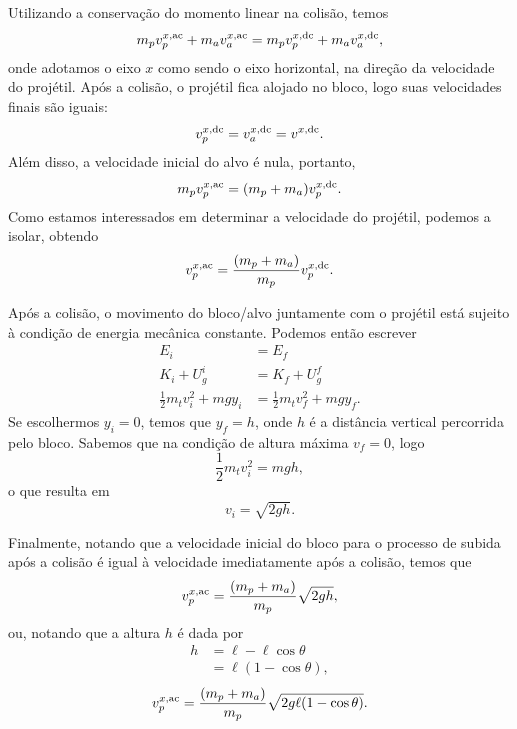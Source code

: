 Utilizando a conservação do momento linear na colisão, temos
\begin{equation}
    m_p v_p^{x, \rm{ac}} + m_a v_a^{x, \rm{ac}} = m_p v_p^{x, \rm{dc}} + m_a v_a^{x, \rm{dc}},
\end{equation}
%
onde adotamos o eixo $x$ como sendo o eixo horizontal, na direção da velocidade do projétil. Após a colisão, o projétil fica alojado no bloco, logo suas velocidades finais são iguais:
\begin{equation}
    v_p^{x, \rm{dc}} = v_a^{x, \rm{dc}} = v^{x, \rm{dc}}.
\end{equation}
%
Além disso, a velocidade inicial do alvo é nula, portanto,
\begin{equation}
    m_p v_p^{x, \rm{ac}} = (m_p + m_a) v_p^{x, \rm{dc}}.
\end{equation}
%
Como estamos interessados em determinar a velocidade do projétil, podemos a isolar, obtendo
\begin{equation}
    v_p^{x, \rm{ac}} = \frac{(m_p + m_a)}{m_p} v_p^{x, \rm{dc}}.
\end{equation}

Após a colisão, o movimento do bloco/alvo juntamente com o projétil está sujeito à condição de energia mecânica constante. Podemos então escrever
\begin{align}
    E_i &= E_f \\
    K_i + U_g^i &= K_f + U_g^f \\
    \frac{1}{2} m_t v_i^2 + mgy_i &= \frac{1}{2} m_t v_f^2 + mgy_f.
\end{align}
%
Se escolhermos $y_i = 0$, temos que $y_f = h$, onde $h$ é a distância vertical percorrida pelo bloco. Sabemos que na condição de altura máxima $v_f = 0$, logo
\begin{equation}
    \frac{1}{2} m_t v_i^2 = mgh,
\end{equation}
%
o que resulta em
\begin{equation}
    v_i = \sqrt{2gh}.
\end{equation}

Finalmente, notando que a velocidade inicial do bloco para o processo de subida após a colisão é igual à velocidade imediatamente após a colisão, temos que
\begin{equation}
    v_p^{x, \rm{ac}} = \frac{(m_p + m_a)}{m_p} \sqrt{2gh},
\end{equation}
%
ou, notando que a altura $h$ é dada por
\begin{align}
    h &= \ell - \ell\cos\theta \\
    &= \ell (1 - \cos\theta),
\end{align}
%
\begin{equation}
    v_p^{x, \rm{ac}} = \frac{(m_p + m_a)}{m_p} \sqrt{2g\ell(1-\cos\theta)}.
\end{equation}

